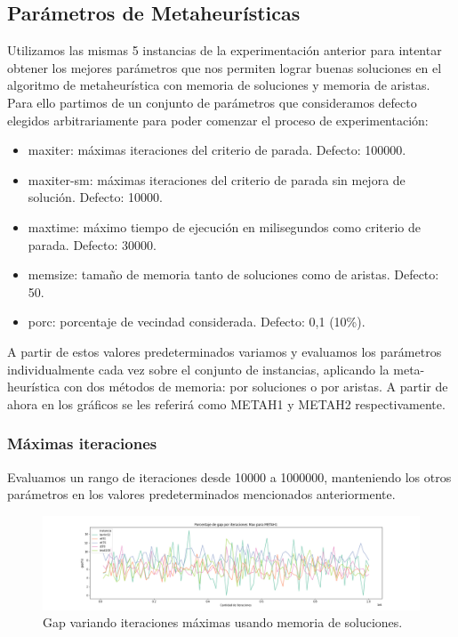 \documentclass[10pt,a4paper]{article}
\begin{document}
\subsection{Parámetros de Metaheurísticas} \label{exp-parametros}
Utilizamos las mismas 5 instancias de la experimentación anterior para intentar obtener los mejores parámetros que nos permiten lograr buenas soluciones en el algoritmo de metaheurística con memoria de soluciones y memoria de aristas. Para ello partimos de un conjunto de parámetros que consideramos defecto elegidos arbitrariamente para poder comenzar el proceso de experimentación:
\begin{itemize}
    \item maxiter: máximas iteraciones del criterio de parada. Defecto: 100000.
    \item maxiter-sm: máximas iteraciones del criterio de parada sin mejora de solución. Defecto: 10000.
    \item maxtime: máximo tiempo de ejecución en milisegundos como criterio de parada. Defecto: 30000.
    \item memsize: tamaño de memoria tanto de soluciones como de aristas. Defecto: 50.
    \item porc: porcentaje de vecindad considerada. Defecto: 0,1 (10\%).
\end{itemize}
A partir de estos valores predeterminados variamos y evaluamos los parámetros individualmente cada vez sobre el conjunto de instancias, aplicando la meta-heurística con dos métodos de memoria: por soluciones o por aristas. A partir de ahora en los gráficos se les referirá como METAH1 y METAH2 respectivamente.

\subsubsection{Máximas iteraciones}
Evaluamos un rango de iteraciones desde 10000 a 1000000, manteniendo los otros parámetros en los valores predeterminados mencionados anteriormente.

\begin{figure}[h!]
    \centering
    \includegraphics[scale=0.3]{Graphs-metaH/max-iter-gap-METAH1}
    \caption{Gap variando iteraciones máximas usando memoria de soluciones.}
    \label{fig:exp_maxiter_gap_metah1}
\end{figure}
\end{document}
